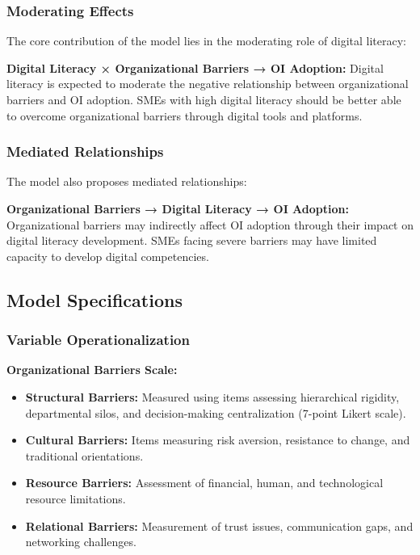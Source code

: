\subsubsection{Moderating Effects}
The core contribution of the model lies in the moderating role of digital literacy:

\textbf{Digital Literacy × Organizational Barriers → OI Adoption:}
Digital literacy is expected to moderate the negative relationship between organizational barriers and OI adoption. SMEs with high digital literacy should be better able to overcome organizational barriers through digital tools and platforms.

\subsubsection{Mediated Relationships}
The model also proposes mediated relationships:

\textbf{Organizational Barriers → Digital Literacy → OI Adoption:}
Organizational barriers may indirectly affect OI adoption through their impact on digital literacy development. SMEs facing severe barriers may have limited capacity to develop digital competencies.

\subsection{Model Specifications}

\subsubsection{Variable Operationalization}

\textbf{Organizational Barriers Scale:}
\begin{itemize}
    \item \textbf{Structural Barriers:} Measured using items assessing hierarchical rigidity, departmental silos, and decision-making centralization (7-point Likert scale).
    \item \textbf{Cultural Barriers:} Items measuring risk aversion, resistance to change, and traditional orientations.
    \item \textbf{Resource Barriers:} Assessment of financial, human, and technological resource limitations.
    \item \textbf{Relational Barriers:} Measurement of trust issues, communication gaps, and networking challenges.
\end{itemize}

